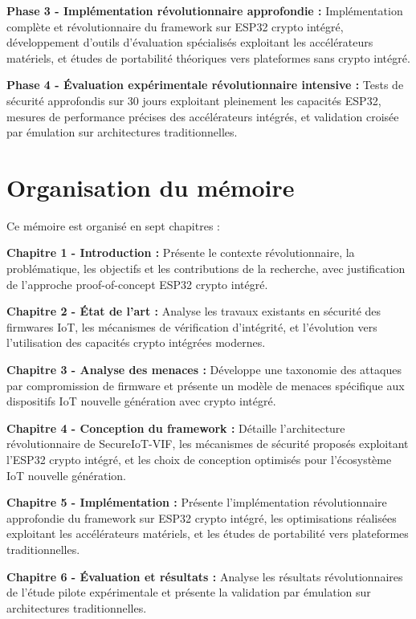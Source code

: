 \textbf{Phase 3 - Implémentation révolutionnaire approfondie :} Implémentation complète et révolutionnaire du framework sur ESP32 crypto intégré, développement d'outils d'évaluation spécialisés exploitant les accélérateurs matériels, et études de portabilité théoriques vers plateformes sans crypto intégré.

\textbf{Phase 4 - Évaluation expérimentale révolutionnaire intensive :} Tests de sécurité approfondis sur 30 jours exploitant pleinement les capacités ESP32, mesures de performance précises des accélérateurs intégrés, et validation croisée par émulation sur architectures traditionnelles.

\section{Organisation du mémoire}

Ce mémoire est organisé en sept chapitres :

\textbf{Chapitre 1 - Introduction :} Présente le contexte révolutionnaire, la problématique, les objectifs et les contributions de la recherche, avec justification de l'approche proof-of-concept ESP32 crypto intégré.

\textbf{Chapitre 2 - État de l'art :} Analyse les travaux existants en sécurité des firmwares IoT, les mécanismes de vérification d'intégrité, et l'évolution vers l'utilisation des capacités crypto intégrées modernes.

\textbf{Chapitre 3 - Analyse des menaces :} Développe une taxonomie des attaques par compromission de firmware et présente un modèle de menaces spécifique aux dispositifs IoT nouvelle génération avec crypto intégré.

\textbf{Chapitre 4 - Conception du framework :} Détaille l'architecture révolutionnaire de SecureIoT-VIF, les mécanismes de sécurité proposés exploitant l'ESP32 crypto intégré, et les choix de conception optimisés pour l'écosystème IoT nouvelle génération.

\textbf{Chapitre 5 - Implémentation :} Présente l'implémentation révolutionnaire approfondie du framework sur ESP32 crypto intégré, les optimisations réalisées exploitant les accélérateurs matériels, et les études de portabilité vers plateformes traditionnelles.

\textbf{Chapitre 6 - Évaluation et résultats :} Analyse les résultats révolutionnaires de l'étude pilote expérimentale et présente la validation par émulation sur architectures traditionnelles.

